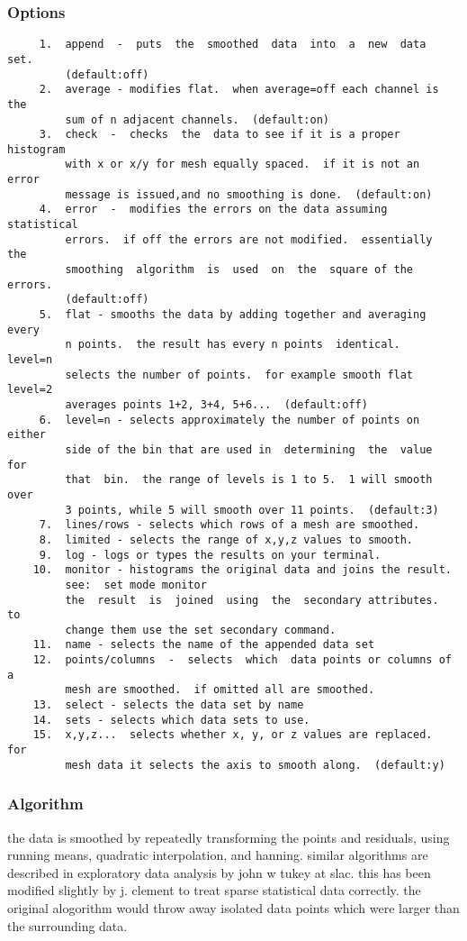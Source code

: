 \subsubsection{Options}
\begin{verbatim}
     1.  append  -  puts  the  smoothed  data  into  a  new  data  set.
         (default:off) 
     2.  average - modifies flat.  when average=off each channel is the
         sum of n adjacent channels.  (default:on) 
     3.  check  -  checks  the  data to see if it is a proper histogram
         with x or x/y for mesh equally spaced.  if it is not an  error
         message is issued,and no smoothing is done.  (default:on) 
     4.  error  -  modifies the errors on the data assuming statistical
         errors.  if off the errors are not modified.  essentially  the
         smoothing  algorithm  is  used  on  the  square of the errors.
         (default:off) 
     5.  flat - smooths the data by adding together and averaging every
         n points.  the result has every n points  identical.   level=n
         selects the number of points.  for example smooth flat level=2
         averages points 1+2, 3+4, 5+6...  (default:off) 
     6.  level=n - selects approximately the number of points on either
         side of the bin that are used in  determining  the  value  for
         that  bin.  the range of levels is 1 to 5.  1 will smooth over
         3 points, while 5 will smooth over 11 points.  (default:3) 
     7.  lines/rows - selects which rows of a mesh are smoothed.  
     8.  limited - selects the range of x,y,z values to smooth.  
     9.  log - logs or types the results on your terminal.  
    10.  monitor - histograms the original data and joins the result.  
         see:  set mode monitor 
         the  result  is  joined  using  the  secondary attributes.  to
         change them use the set secondary command.  
    11.  name - selects the name of the appended data set 
    12.  points/columns  -  selects  which  data points or columns of a
         mesh are smoothed.  if omitted all are smoothed.  
    13.  select - selects the data set by name 
    14.  sets - selects which data sets to use.  
    15.  x,y,z...  selects whether x, y, or z values are replaced.  for
         mesh data it selects the axis to smooth along.  (default:y) 
\end{verbatim}

\subsubsection{Algorithm}
the  data  is  smoothed  by  repeatedly  transforming  the  points  and
residuals, using running means, quadratic interpolation,  and  hanning.
similar algorithms are described in exploratory data analysis by john w
tukey at slac.  this has been modified slightly by j.  clement to treat
sparse statistical data correctly.  the original alogorithm would throw
away isolated data points which were larger than the surrounding data. 
